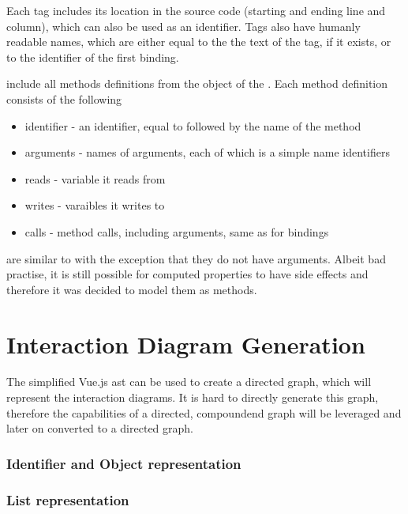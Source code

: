 Each tag includes its location in the source code (starting and ending line and column), which can also be used as an identifier. Tags also have humanly readable names, which are either equal to the the text of the tag, if it exists, or to the identifier of the first binding. 

 include all methods definitions from the  object of the . Each method definition consists of the following
\begin{itemize}
    \item identifier - an identifier, equal to  followed by the name of the method
    \item arguments - names of arguments, each of which is a simple name identifiers
    \item reads - variable it reads from
    \item writes - varaibles it writes to
    \item calls - method calls, including arguments, same as for bindings 
\end{itemize}

 are similar to  with the exception that they do not have arguments. Albeit bad practise, it is still possible for computed properties to have side effects and therefore it was decided to model them as methods.

\section{Interaction Diagram Generation}

The simplified Vue.js \gls{ast} can be used to create a directed graph, which will represent the interaction diagrams. It is hard to directly generate this graph, therefore the capabilities of a directed, compoundend graph will be leveraged and later on converted to a directed graph.

\subsubsection{Identifier and Object representation}
\subsubsection{List representation}
